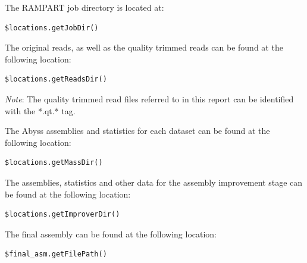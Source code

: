\documentclass{amsart}
\begin{document}
The RAMPART job directory is located at:

\begin{lstlisting}[label=path:1]
$locations.getJobDir()
\end{lstlisting}

The original reads, as well as the quality trimmed reads can be found at the following location:

\begin{lstlisting}[label=path:1]
$locations.getReadsDir()
\end{lstlisting}

\emph{Note}: The quality trimmed read files referred to in this report can be identified with the *.qt.* tag.

The Abyss assemblies and statistics for each dataset can be found at the following location:

\begin{lstlisting}[label=path:1]
$locations.getMassDir()
\end{lstlisting}


The assemblies, statistics and other data for the assembly improvement stage can be found at the following location:

\begin{lstlisting}[label=path:1]
$locations.getImproverDir()
\end{lstlisting} 


The final assembly can be found at the following location:

\begin{lstlisting}[label=path:1]
$final_asm.getFilePath()
\end{lstlisting}
\end{document}
